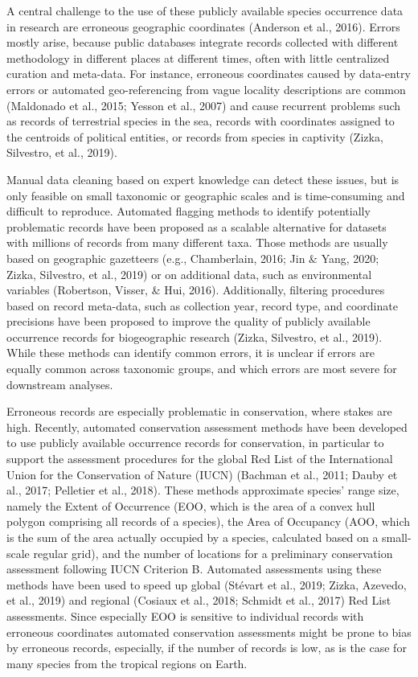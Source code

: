 \documentclass[
  12pt,
]{article}
\begin{document}
A central challenge to the use of these publicly available species occurrence data in research are erroneous geographic coordinates (Anderson et al., 2016). Errors mostly arise, because public databases integrate records collected with different methodology in different places at different times, often with little centralized curation and meta-data. For instance, erroneous coordinates caused by data-entry errors or automated geo-referencing from vague locality descriptions are common (Maldonado et al., 2015; Yesson et al., 2007) and cause recurrent problems such as records of terrestrial species in the sea, records with coordinates assigned to the centroids of political entities, or records from species in captivity (Zizka, Silvestro, et al., 2019).

Manual data cleaning based on expert knowledge can detect these issues, but is only feasible on small taxonomic or geographic scales and is time-consuming and difficult to reproduce. Automated flagging methods to identify potentially problematic records have been proposed as a scalable alternative for datasets with millions of records from many different taxa. Those methods are usually based on geographic gazetteers (e.g., Chamberlain, 2016; Jin \& Yang, 2020; Zizka, Silvestro, et al., 2019) or on additional data, such as environmental variables (Robertson, Visser, \& Hui, 2016). Additionally, filtering procedures based on record meta-data, such as collection year, record type, and coordinate precisions have been proposed to improve the quality of publicly available occurrence records for biogeographic research (Zizka, Silvestro, et al., 2019). While these methods can identify common errors, it is unclear if errors are equally common across taxonomic groups, and which errors are most severe for downstream analyses.

Erroneous records are especially problematic in conservation, where stakes are high. Recently, automated conservation assessment methods have been developed to use publicly available occurrence records for conservation, in particular to support the assessment procedures for the global Red List of the International Union for the Conservation of Nature (IUCN) (Bachman et al., 2011; Dauby et al., 2017; Pelletier et al., 2018). These methods approximate species' range size, namely the Extent of Occurrence (EOO, which is the area of a convex hull polygon comprising all records of a species), the Area of Occupancy (AOO, which is the sum of the area actually occupied by a species, calculated based on a small-scale regular grid), and the number of locations for a preliminary conservation assessment following IUCN Criterion B. Automated assessments using these methods have been used to speed up global (Stévart et al., 2019; Zizka, Azevedo, et al., 2019) and regional (Cosiaux et al., 2018; Schmidt et al., 2017) Red List assessments. Since especially EOO is sensitive to individual records with erroneous coordinates automated conservation assessments might be prone to bias by erroneous records, especially, if the number of records is low, as is the case for many species from the tropical regions on Earth.
\end{document}
